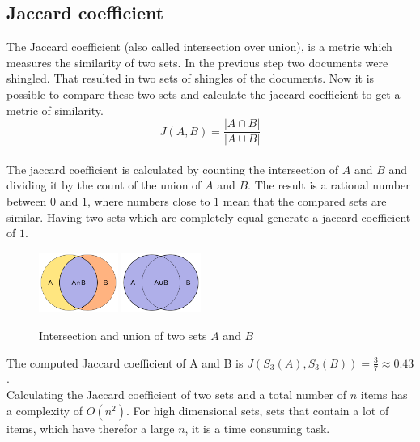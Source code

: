 \subsection{Jaccard coefficient}

The Jaccard coefficient (also called intersection over union), is a metric which measures the similarity of two sets. In the previous step two documents were shingled. That resulted in two sets of shingles of the documents. Now it is possible to compare these two sets and calculate the jaccard coefficient to get a metric of similarity.\\

\begin{equation}
    J(A,B) = \frac{ | A \cap B | }{ | A \cup B | }
\end{equation} \\

The jaccard coefficient is calculated by counting the intersection of $ A $ and $ B $ and dividing it by the count of the union of $ A $ and $ B $. The result is a rational number between $ 0 $ and $ 1 $, where numbers close to $ 1 $ mean that the compared sets are similar. Having two sets which are completely equal generate a jaccard coefficient of $ 1 $.\\

\begin{figure}[H]
    \centering
    \includegraphics[width=0.23\textwidth]{images/Intersection_of_sets_A_and_B.png} 
    \includegraphics[width=0.23\textwidth]{images/Union_of_sets_A_and_B.png}
    \caption{Intersection and union of two sets $ A $ and $ B $ \cite{intersectionImage,unionImage}}
\end{figure}

The computed Jaccard coefficient of A and B is  $ J(S_3(A),S_3(B)) = \frac{3}{7} \approx 0.43 $.\\

Calculating the Jaccard coefficient of two sets and a total number of $ n $ items has a complexity of $ O(n^2) $. For high dimensional sets, sets that contain a lot of items, which have therefor a large $ n $, it is a time consuming task.\\

